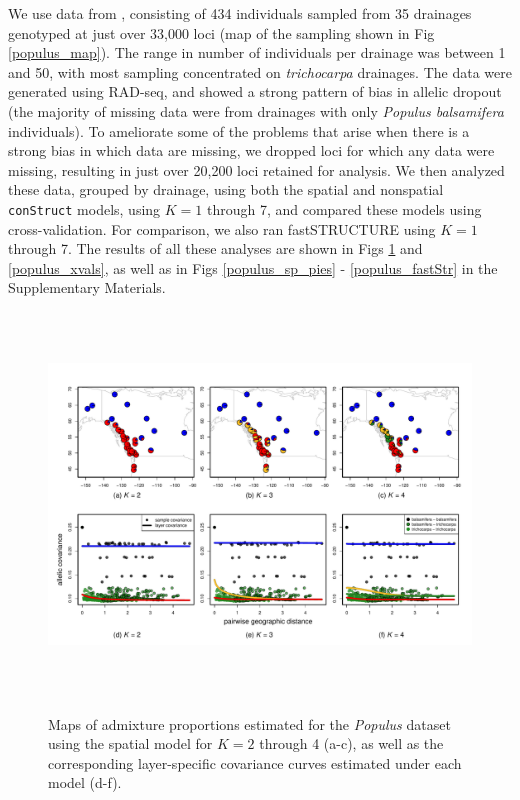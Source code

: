 \documentclass[12pt]{article}
\newcommand{\tri}{\textit{trichocarpa}}
\begin{document}
We use data from \cite{geraldes_etal_2014}, 
consisting of 434 individuals sampled from 35 drainages 
genotyped at just over 33,000 loci (map of the sampling shown in Fig \ref{populus_map}).
The range in number of individuals per drainage was between 1 and 50, 
with most sampling concentrated on \tri{} drainages.
The data were generated using RAD-seq, 
and showed a strong pattern of bias in allelic dropout 
(the majority of missing data were from drainages with only \textit{Populus balsamifera} individuals).
To ameliorate some of the problems that arise when there is a strong bias in which data are missing, 
we dropped loci for which any data were missing, 
resulting in just over 20,200 loci retained for analysis.  
We then analyzed these data, grouped by drainage, using both the spatial and nonspatial \texttt{conStruct} models, 
using $K = 1$ through 7,
and compared these models using cross-validation.
For comparison, we also ran fastSTRUCTURE \citep{fastStructure} 
using $K = 1$ through 7.
The results of all these analyses are shown in 
Figs \ref{populus_pies} and \ref{populus_xvals}, 
as well as in Figs \ref{populus_sp_pies} - \ref{populus_fastStr} in the Supplementary Materials.

\begin{figure}
	\centering
		{\includegraphics[width=6in,height=4in]{figs/populus/pop_sp_results.pdf}}
	\caption{
	Maps of admixture proportions estimated for the \textit{Populus} dataset 
	using the spatial model for $K=2$ through 4 (a-c), 
	as well as the corresponding layer-specific covariance curves estimated under each model (d-f).
    }\label{populus_pies}
\end{figure}
\end{document}
